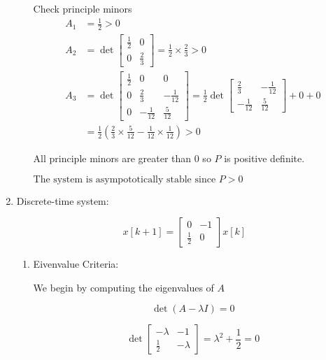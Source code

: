 \documentclass{article}
\begin{document}
\begin{enumerate}[label=\alph*)]
\begin{enumerate}[label=\roman*)]
        Check principle minors
        \begin{align*}
            A_1 &= \frac{1}{2} > 0 \\
            A_2 &= \det
            \begin{bmatrix}
            \frac{1}{2} & 0 \\
            0 & \frac{2}{3}   
            \end{bmatrix}
            = \frac{1}{2} \times \frac{2}{3} > 0 \\
            A_3 &= \det
            \begin{bmatrix}
                \frac{1}{2} & 0 & 0 \\
                0 & \frac{2}{3} & -\frac{1}{12} \\
                0 & -\frac{1}{12} & \frac{5}{12} 
            \end{bmatrix}
            = \frac{1}{2}\det
            \begin{bmatrix}
                \frac{2}{3} & -\frac{1}{12} \\
                -\frac{1}{12} & \frac{5}{12}
            \end{bmatrix}
            + 0 + 0 \\
            &= \frac{1}{2}\left(\frac{2}{3} \times  \frac{5}{12} - \frac{1}{12} \times \frac{1}{12}\right) > 0
        \end{align*}

        All principle minors are greater than 0 so $P$ is positive definite.

        $\boxed{\text{The system is asympototically stable since $P > 0$}}$
    \end{enumerate}

    \item Discrete-time system:

    \[
    x[k + 1] =
    \begin{bmatrix}
    0 & -1 \\
    \frac{1}{2} & 0 
    \end{bmatrix} 
    x[k]
    \]

    \begin{enumerate}[label=\roman*)]
        \item Eivenvalue Criteria:

        We begin by computing the eigenvalues of $A$

        \[ \det(A - \lambda I) = 0\]

        \[
        \det
        \begin{bmatrix}
            -\lambda & -1 \\
            \frac{1}{2} & -\lambda
        \end{bmatrix}
        = \lambda^2 + \frac{1}{2} = 0
        \]


\end{enumerate}
\end{enumerate}
\end{document}
